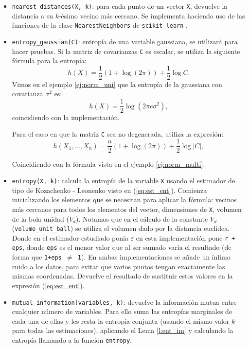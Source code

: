 \documentclass[12pt,a4paper]{report} %
\theoremstyle{definition}
\begin{document}
\begin{itemize}
\item \texttt{nearest\_distances(X, k)}: para cada punto de un vector \texttt{X}, devuelve la distancia a su $k$-ésimo vecino más cercano. Se implementa haciendo uso de las funciones de la clase \texttt{NearestNeighbors} de \texttt{scikit-learn} \cite{nearestneighbors}.

\item \texttt{entropy\_gaussian(C)}: entropía de una variable gaussiana, se utilizará para hacer pruebas. Si la matriz de covarianzas \texttt{C} es escalar, se utiliza la siguiente fórmula para la entropía:\[
  h(X) = \frac{1}{2}\left ( 1 + \log(2\pi) \right )+ \frac{1}{2} \log C.
  \]
Vimos en el ejemplo \ref{ej:norm_uni} que la entropía de la gaussiana con covarianza $\sigma^2$ es:\[
h(X) = \frac{1}{2}\log (2\pi e \sigma^2 ),
\]
coincidiendo con la implementación.

Para el caso en que la matriz \texttt{C} sea no degenerada, utiliza la expresión:\[
h(X_1,\dots, X_n) = \frac{n}{2} \left (1 + \log(2\pi) \right) + \frac{1}{2}\log |C|,
\]

Coincidiendo con la fórmula vista en el ejemplo \ref{ej:norm_multi}.

\item \texttt{entropy(X, k)}: calcula la entropía de la variable \texttt{X} usando el estimador de tipo de Kozachenko - Leonenko visto en  (\ref{eq:est_ent}). Comienza inicializando los elementos que se necesitan para aplicar la fórmula: vecinos más cercanos para todos los elementos del vector, dimensiones de \texttt{X}, volumen de la bola unidad ($V_d$). Notamos que en el cálculo de la constante $V_d$ (\texttt{volume\_unit\_ball}) se utiliza el volumen dado por la distancia euclídea. Donde en el estimador estudiado ponía $\varepsilon$ en esta implementación pone \texttt{r + eps}, donde \texttt{eps} es el menor valor que al ser sumado varía el resultado (de forma que  \texttt{1+eps $\neq$ 1}). En ambas implementaciones se añade un ínfimo ruido a los datos, para evitar que varios puntos tengan exactamente las mismas coordenadas. Devuelve el resultado de sustituir estos valores en la expresión (\ref{eq:est_ent}).

\item \texttt{mutual\_information(variables, k)}: devuelve la información mutua entre cualquier número de variables. Para ello suma las entropías marginales de cada una de ellas y les resta la entropía conjunta (usando el mismo valor $k$ para todas las estimaciones), aplicando el Lema \ref{l:ent_im} y calculando la entropía llamando a la función \texttt{entropy}.


\end{itemize}
\end{document}
